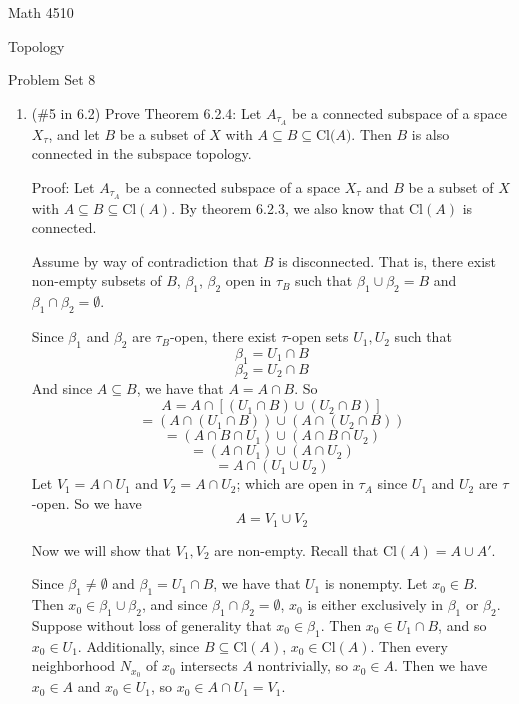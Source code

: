 \documentclass[12pt]{article}
\begin{document}
\noindent Math 4510

\noindent Topology

\vspace{.2in}
\begin{center}
Problem Set 8
\end{center}

 \begin{enumerate}%
 \item(\#5 in 6.2) Prove Theorem 6.2.4: Let $A_{\tau_A}$ be a connected subspace of a space $X_{\tau}$, and let $B$ be a subset of $X$ with $A\subseteq B\subseteq \text{Cl($A$)}$. Then $B$ is also connected in the subspace topology.
 
 Proof: Let $A_{\tau_A}$ be a connected subspace of a space $X_{\tau}$ and $B$ be a subset of $X$ with $A \subseteq B \subseteq \text{Cl}(A)$. By theorem 6.2.3, we also know that $\text{Cl}(A)$ is connected.
 
 Assume by way of contradiction that $B$ is disconnected. That is, there exist non-empty subsets of $B$, $\beta_1$, $\beta_2$ open in $\tau_B$ such that $\beta_1 \cup \beta_2 = B$ and $\beta_1 \cap \beta_2 = \emptyset$.
 
 Since $\beta_1$ and $\beta_2$ are $\tau_B$-open, there exist $\tau$-open sets $U_1, U_2$ such that
 \[\beta_1 = U_1 \cap B\]
 \[\beta_2 = U_2 \cap B\]
 And since $A \subseteq B$, we have that $A = A \cap B$. So 
 \[A = A \cap [(U_1 \cap B) \cup (U_2 \cap B)]\]
 \[ = (A \cap (U_1 \cap B)) \cup (A \cap (U_2 \cap B))\]
 \[ = (A \cap B \cap U_1) \cup (A \cap B \cap U_2)\]
 \[ = (A \cap U_1) \cup (A \cap U_2)\]
\[ = A \cap (U_1 \cup U_2)\]
 Let $V_1 = A \cap U_1$ and $V_2 = A \cap U_2$; which are open in $\tau_A$ since $U_1$ and $U_2$ are $\tau$-open. So we have
 \[A = V_1 \cup V_2\]
 
 Now we will show that $V_1, V_2$ are non-empty. Recall that $\text{Cl}(A) = A \cup A'$.
 
 Since $\beta_1 \neq \emptyset$ and $\beta_1 = U_1 \cap B$, we have that $U_1$ is nonempty. Let $x_0 \in B$. Then $x_0 \in \beta_1 \cup \beta_2$, and since $\beta_1 \cap \beta_2 = \emptyset$, $x_0$ is either exclusively in $\beta_1$ or $\beta_2$. Suppose without loss of generality that $x_0 \in \beta_1$. 
 Then $x_0 \in U_1 \cap B$, and so $x_0 \in U_1$. Additionally, since $B \subseteq \text{Cl}(A)$, $x_0 \in \text{Cl}(A)$. Then every neighborhood $N_{x_0}$ of $x_0$ intersects $A$ nontrivially, so $x_0 \in A$. Then we have $x_0 \in A$ and $x_0 \in U_1$, so $x_0 \in A \cap U_1 = V_1$.
 

\end{enumerate}
\end{document}
